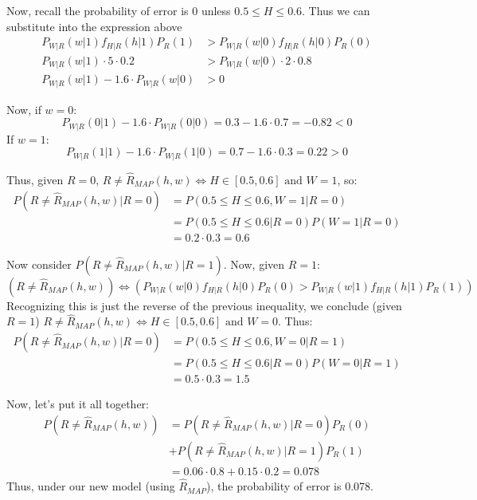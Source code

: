 \documentclass[paper=a4, fontsize=11pt]{scrartcl} %
\numberwithin{equation}{section} %
\numberwithin{figure}{section} %
\numberwithin{table}{section} %
\begin{document}
Now, recall the probability of error is 0 unless $0.5 \leq H \leq 0.6$. Thus we can substitute into the expression above
\begin{align*}
P_{W | R}(w | 1) f_{H | R}(h | 1) P_R(1) &> P_{W | R}(w | 0) f_{H | R}(h | 0) P_R(0) \\
P_{W | R}(w | 1) \cdot 5 \cdot 0.2 &> P_{W | R}(w | 0) \cdot 2 \cdot 0.8 \\ 
P_{W | R}(w | 1) - 1.6 \cdot P_{W | R}(w | 0) &> 0 
\end{align*}

Now, if $w = 0$:
\[ P_{W | R}(0 | 1) - 1.6 \cdot P_{W | R}(0 | 0) = 0.3 - 1.6 \cdot 0.7 = -0.82  < 0 \]
If $w = 1$:
\[ P_{W | R}(1 | 1) - 1.6 \cdot P_{W | R}(1 | 0) = 0.7 - 1.6 \cdot 0.3 = 0.22  > 0 \]

Thus, given $R = 0$, $R \ne \hat{R}_{MAP}(h, w) \iff H \in [0.5,0.6] \textrm{ and } W = 1$, so:
\begin{align*}
P(R \ne \hat{R}_{MAP}(h, w) | R = 0) &= P(0.5 \leq H \leq 0.6, W = 1 | R = 0) \\
   &= P(0.5 \leq H \leq 0.6 | R = 0) P(W = 1 | R = 0) \\
   &= 0.2 \cdot 0.3 = 0.6
\end{align*}

Now consider $P(R \ne \hat{R}_{MAP}(h, w) | R = 1)$. Now, given $R = 1$:
\[(R \ne \hat{R}_{MAP}(h, w)) \iff \left(P_{W | R}(w | 0) f_{H | R}(h | 0) P_R(0) > P_{W | R}(w | 1) f_{H | R}(h | 1) P_R(1)\right) \] 
Recognizing this is just the reverse of the previous inequality, we conclude (given $R = 1$) $R \ne \hat{R}_{MAP}(h, w) \iff H \in [0.5,0.6] \textrm{ and } W = 0$. Thus:
\begin{align*}
P(R \ne \hat{R}_{MAP}(h, w) | R = 0) &= P(0.5 \leq H \leq 0.6, W = 0 | R = 1) \\
   &= P(0.5 \leq H \leq 0.6 | R = 0) P(W = 0 | R = 1) \\
   &= 0.5 \cdot 0.3 = 1.5
\end{align*}

Now, let's put it all together:
\begin{align*}
P(R \ne \hat{R}_{MAP}(h, w)) &= P(R \ne \hat{R}_{MAP}(h, w) | R = 0)P_R(0) \\
& + P(R \ne \hat{R}_{MAP}(h, w) | R = 1)P_R(1) \\
   &= 0.06 \cdot 0.8 + 0.15 \cdot 0.2 = 0.078
\end{align*}
Thus, under our new model (using $\hat{R}_{MAP}$), the probability of error is 0.078.

\end{document}
